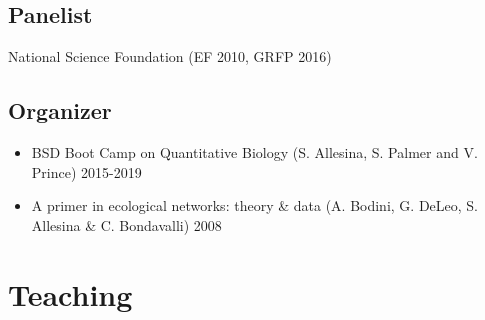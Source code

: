 \documentclass[10,letter,]{awesome-cv}
\providecommand{\tightlist}{%
	\setlength{\itemsep}{0pt}\setlength{\parskip}{0pt}}
\begin{document}
\hypertarget{panelist}{%
\subsection{Panelist}\label{panelist}}

National Science Foundation (EF 2010, GRFP 2016)

\hypertarget{organizer}{%
\subsection{Organizer}\label{organizer}}

\begin{itemize}
\tightlist
\item
  BSD Boot Camp on Quantitative Biology (S. Allesina, S. Palmer and V.
  Prince) 2015-2019
\item
  A primer in ecological networks: theory \& data (A. Bodini, G. DeLeo,
  S. Allesina \& C. Bondavalli) 2008
\end{itemize}

\hypertarget{teaching}{%
\section{Teaching}\label{teaching}}
\end{document}
